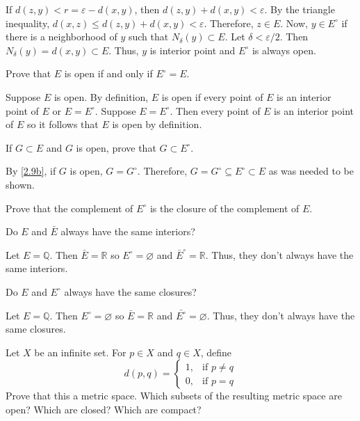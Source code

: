 \begin{exercise}
\begin{exercise}[label = (\alph*), ref = \arabic{exercisei}(\alph*)]
    If \(d(z,y) < r = \varepsilon - d(x,y)\), then \(d(z,y) + d(x,y) < \varepsilon\).
    By the triangle inequality, \(d(x,z)\leq d(z,y) + d(x,y) < \varepsilon\).
    Therefore, \(z\in E\).
    Now, \(y\in E^{\circ}\) if there is a neighborhood of \(y\) such that
    \(N_{\delta}(y)\subset E\).
    Let \(\delta < \varepsilon/2\).
    Then \(N_{\delta}(y) = d(x,y)\subset E\).
    Thus, \(y\) is interior point and \(E^{\circ}\) is always open.
  \item
    \label{2.9b}
    Prove that \(E\) is open if and only if \(E^{\circ} = E\).
    \par\smallskip
    Suppose \(E\) is open.
    By definition, \(E\) is open if every point of \(E\) is an interior point
    of \(E\) or \(E = E^{\circ}\).
    Suppose \(E = E^{\circ}\).
    Then every point of \(E\) is an interior point of \(E\) so it follows that
    \(E\) is open by definition.
  \item
    If \(G\subset E\) and \(G\) is open, prove that \(G\subset E^{\circ}\).
    \par\smallskip
    By \cref{2.9b}, if \(G\) is open, \(G = G^{\circ}\).
    Therefore, \(G = G^{\circ}\subseteq E^{\circ}\subset E\) as was needed to
    be shown.
  \item
    Prove that the complement of \(E^{\circ}\) is the closure of the
    complement of \(E\).
  \item
    Do \(E\) and \(\bar{E}\) always have the same interiors?
    \par\smallskip
    Let \(E = \mathbb{Q}\).
    Then \(\bar{E} = \mathbb{R}\) so \(E^{\circ} = \varnothing\) and
    \(\bar{E}^{\circ} = \mathbb{R}\).
    Thus, they don't always have the same interiors.
  \item
    Do \(E\) and \(E^{\circ}\) always have the same closures?
    \par\smallskip
    Let \(E = \mathbb{Q}\).
    Then \(E^{\circ} = \varnothing\) so \(\bar{E} = \mathbb{R}\) and
    \(\bar{E^{\circ}} = \varnothing\).
    Thus, they don't always have the same closures.
  \end{exercise}
\item
  Let \(X\) be an infinite set.
  For \(p\in X\) and \(q\in X\), define
  \[
  d(p, q) =
  \begin{cases}
    1, & \text{if } p\neq q\\
    0, & \text{if } p = q
  \end{cases}
  \]
  Prove that this a metric space.
  Which subsets of the resulting metric space are open?
  Which are closed? Which are compact?

\end{exercise}
